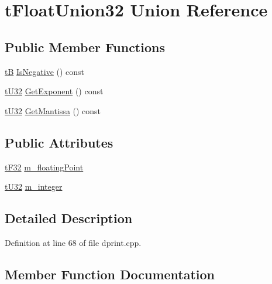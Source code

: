 \hypertarget{uniontFloatUnion32}{}\section{t\+Float\+Union32 Union Reference}
\label{uniontFloatUnion32}
\subsection*{Public Member Functions}
\begin{DoxyCompactItemize}
\item 
\hyperlink{dstandard_8h_ad203aed3ab57b120eb54c2043f60dc49}{tB} \hyperlink{uniontFloatUnion32_a712fc8a147092d725afef356b58e222d}{Is\+Negative} () const 
\item 
\hyperlink{dstandard_8h_aee96db7e18784e05ed6b0bcaeec3f7f6}{t\+U32} \hyperlink{uniontFloatUnion32_a5fdea8e6c84f336aa35050476f3cd776}{Get\+Exponent} () const 
\item 
\hyperlink{dstandard_8h_aee96db7e18784e05ed6b0bcaeec3f7f6}{t\+U32} \hyperlink{uniontFloatUnion32_a09e9d4d1db976209ea3a5720ae55b373}{Get\+Mantissa} () const 
\end{DoxyCompactItemize}
\subsection*{Public Attributes}
\begin{DoxyCompactItemize}
\item 
\hyperlink{dstandard_8h_adfd1aaaa5a9470e6009d2770939ae5ba}{t\+F32} \hyperlink{uniontFloatUnion32_ad1a5322bcde302e59bcd001125651e6a}{m\+\_\+floating\+Point}
\item 
\hyperlink{dstandard_8h_aee96db7e18784e05ed6b0bcaeec3f7f6}{t\+U32} \hyperlink{uniontFloatUnion32_af3cba3a9212a20888a1a1a6848bd5c26}{m\+\_\+integer}
\end{DoxyCompactItemize}


\subsection{Detailed Description}


Definition at line 68 of file dprint.\+cpp.



\subsection{Member Function Documentation}
